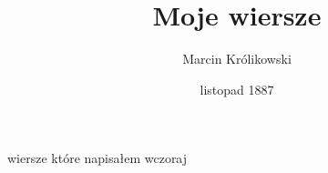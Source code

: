 \documentclass[12pt, letterpaper, titlepage]{article}
\title{Moje wiersze}
\author{Marcin Królikowski}
\date{listopad 1887}
\begin{document}
\maketitle
wiersze które napisałem wczoraj
\end{document}
